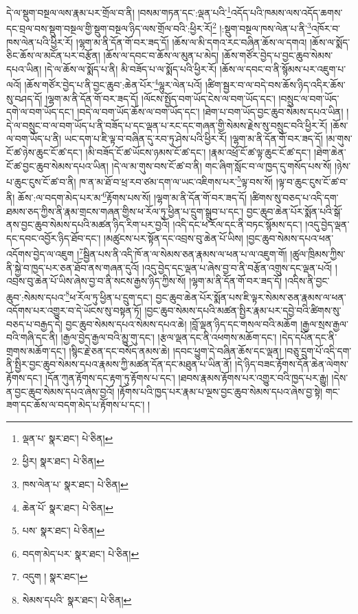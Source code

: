དེ་ལ་སྡུག་བསྔལ་ལས་རྣམ་པར་གྲོལ་བ་ནི། །བསམ་གཏན་དང་:ལྡན་པའི་\footnote{ལྡན་པ་  སྣར་ཐང་།  པེ་ཅིན། }འདོད་པའི་ཁམས་ལས་འདོད་ཆགས་དང་བྲལ་བས་སྡུག་བསྔལ་གྱི་སྡུག་བསྔལ་ཉིད་ལས་གྲོལ་བའི་:ཕྱིར་རོ།\footnote{ཕྱིར།  སྣར་ཐང་།  པེ་ཅིན། } །:སྡུག་བསྔལ་ཁས་ལེན་པ་ནི་\footnote{ཁས་ལེན་པ་  སྣར་ཐང་།  པེ་ཅིན། }འཁོར་བ་ཁས་ལེན་པའི་ཕྱིར་རོ། །ལྷག་མ་ནི་དོན་གོ་བར་ཟད་དོ། །ཆོས་ལ་མི་དགའ་རང་བཞིན་ཆོས་ལ་དགའ། །ཆོས་ལ་སྨོད་ཅིང་ཆོས་ལ་མངོན་པར་བརྩོན། །ཆོས་ལ་དབང་བ་ཆོས་ལ་མུན་པ་མེད། །ཆོས་གཙོར་བྱེད་པ་བྱང་ཆུབ་སེམས་དཔའ་ཡིན། །དེ་ལ་ཆོས་ལ་སྨོད་པ་ནི། མི་བཟོད་པ་ལ་སྨོད་པའི་ཕྱིར་རོ། །ཆོས་ལ་དབང་བ་ནི་སྙོམས་པར་འཇུག་པ་ལའོ། །ཆོས་གཙོར་བྱེད་པ་ནི་བྱང་ཆུབ་:ཆེན་པོར་\footnote{ཆེན་པོ་  སྣར་ཐང་།  པེ་ཅིན། }ལྷུར་ལེན་པའོ། །ཚིག་སྦྱར་བ་ལ་བདེ་བས་ཆོས་ཉིད་འདིར་ཆོས་སུ་བཤད་དོ། །ལྷག་མ་ནི་དོན་གོ་བར་ཟད་དོ། །ལོངས་སྤྱོད་བག་ཡོད་ངེས་ལ་བག་ཡོད་དང་། །བསྲུང་ལ་བག་ཡོད་དགེ་ལ་བག་ཡོད་དང་། །བདེ་ལ་བག་ཡོད་ཆོས་ལ་བག་ཡོད་དང་། །ཐེག་པ་བག་ཡོད་བྱང་ཆུབ་སེམས་དཔའ་ཡིན། །དེ་ལ་བསྲུང་བ་ལ་བག་ཡོད་པ་ནི་བཟོད་པ་དང་ལྡན་པ་རང་དང་གཞན་གྱི་སེམས་རྗེས་སུ་བསྲུང་བའི་ཕྱིར་རོ། །ཆོས་ལ་བག་ཡོད་པ་ནི། ཡང་དག་པ་ཇི་ལྟ་བ་བཞིན་དུ་རབ་ཏུ་ཤེས་པའི་ཕྱིར་རོ། །ལྷག་མ་ནི་དོན་གོ་བར་ཟད་དོ། །མ་གུས་ངོ་ཚ་ཉེས་ཆུང་ངོ་ཚ་དང་། །མི་བཟོད་ངོ་ཚ་ཡོངས་ཉམས་ངོ་ཚ་དང་། །རྣམ་འཕྲོ་ངོ་ཚ་ལྟ་ཆུང་ངོ་ཚ་དང་། །ཐེག་ཆེན་ངོ་ཚ་བྱང་ཆུབ་སེམས་དཔའ་ཡིན། །དེ་ལ་མ་གུས་བས་ངོ་ཚ་བ་ནི། གང་ཞིག་སློང་བ་ལ་ཁྱད་དུ་གསོད་པས་སོ། །ཉེས་པ་ཆུང་ངུས་ངོ་ཚ་བ་ནི། ཁ་ན་མ་ཐོ་བ་ཕྲ་རབ་ཙམ་དག་ལ་ཡང་འཇིགས་པར་\footnote{པས་  སྣར་ཐང་།  པེ་ཅིན། }ལྟ་བས་སོ། །ལྟ་བ་ཆུང་ངུས་ངོ་ཚ་བ་ནི། ཆོས་:ལ་བདག་མེད་པར་མ་\footnote{བདག་མེད་པར་  སྣར་ཐང་།  པེ་ཅིན། }རྟོགས་པས་སོ། །ལྷག་མ་ནི་དོན་གོ་བར་ཟད་དོ། །ཚིགས་སུ་བཅད་པ་འདི་དག་ཐམས་ཅད་ཀྱིས་ནི་རྣམ་གྲངས་གཞན་གྱིས་ཕ་རོལ་ཏུ་ཕྱིན་པ་དྲུག་སྒྲུབ་པ་དང་། བྱང་ཆུབ་ཆེན་པོར་སྨོན་པའི་སྒོ་ནས་བྱང་ཆུབ་སེམས་དཔའི་མཚན་ཉིད་རིག་པར་བྱའོ། །འདི་དང་ཕ་རོལ་དང་ནི་བཏང་སྙོམས་དང་། །འདུ་བྱེད་ལྡན་དང་དབང་འབྱོར་ཉིད་ཐོབ་དང་། །མཚུངས་པར་སྟོན་དང་འབྲས་བུ་ཆེན་པོ་ཡིས། །བྱང་ཆུབ་སེམས་དཔའ་ཕན་འདོགས་བྱེད་ལ་འཇུག །\footnote{འདུག །  སྣར་ཐང་། }སྦྱིན་པས་ནི་འདི་ཁོ་ན་ལ་སེམས་ཅན་རྣམས་ལ་ཕན་པ་ལ་འཇུག་གོ། །ཚུལ་ཁྲིམས་ཀྱིས་ནི་སྐྱེ་བ་ཁྱད་པར་ཅན་ཐོབ་ནས་གཞན་དུའོ། །འདུ་བྱེད་དང་ལྡན་པ་ཞེས་བྱ་བ་ནི་བརྩོན་འགྲུས་དང་ལྡན་པའོ། །འབྲས་བུ་ཆེན་པོ་ཡིས་ཞེས་བྱ་བ་ནི་སངས་རྒྱས་ཉིད་ཀྱིས་སོ། །ལྷག་མ་ནི་དོན་གོ་བར་ཟད་དོ། །འདིས་ནི་བྱང་ཆུབ་:སེམས་དཔའ་\footnote{སེམས་དཔའི་  སྣར་ཐང་།  པེ་ཅིན། }ཕ་རོལ་ཏུ་ཕྱིན་པ་དྲུག་དང་། བྱང་ཆུབ་ཆེན་པོར་སྨོན་པས་ཇི་ལྟར་སེམས་ཅན་རྣམས་ལ་ཕན་འདོགས་པར་འགྱུར་བ་དེ་ཡོངས་སུ་བསྟན་ཏོ། །བྱང་ཆུབ་སེམས་དཔའི་མཚན་སྤྱིར་རྣམ་པར་དབྱེ་བའི་ཚིགས་སུ་བཅད་པ་བརྒྱད་དེ། བྱང་ཆུབ་སེམས་དཔའ་སེམས་དཔའ་ཆེ། །བློ་ལྡན་ཉིད་དང་གསལ་བའི་མཆོག །རྒྱལ་སྲས་རྒྱལ་བའི་གཞི་དང་ནི། །རྒྱལ་བྱེད་རྒྱལ་བའི་མྱུ་གུ་དང་། །རྩལ་ལྡན་དང་ནི་འཕགས་མཆོག་དང་། །དེད་དཔོན་དང་ནི་གྲགས་མཆོག་དང་། །སྙིང་རྗེ་ཅན་དང་བསོད་ནམས་ཆེ། །དབང་ཕྱུག་དེ་བཞིན་ཆོས་དང་ལྡན། །བཅུ་དྲུག་པོ་འདི་དག་ནི་སྤྱིར་བྱང་ཆུབ་སེམས་དཔའ་རྣམས་ཀྱི་མཚན་དོན་དང་མཐུན་པ་ཡིན་ནོ། །དེ་ཉིད་བཟང་རྟོགས་དོན་ཆེན་ལེགས་རྟོགས་དང་། །དོན་ཀུན་རྟོགས་དང་རྟག་ཏུ་རྟོགས་པ་དང་། །ཐབས་རྣམས་རྟོགས་པར་འགྱུར་བའི་ཁྱད་པར་རྒྱུ། །དེས་ན་བྱང་ཆུབ་སེམས་དཔའ་ཞེས་བྱའོ། །རྟོགས་པའི་ཁྱད་པར་རྣམ་པ་ལྔས་བྱང་ཆུབ་སེམས་དཔའ་ཞེས་བྱ་སྟེ། གང་ཟག་དང་ཆོས་ལ་བདག་མེད་པ་རྟོགས་པ་དང་། །
